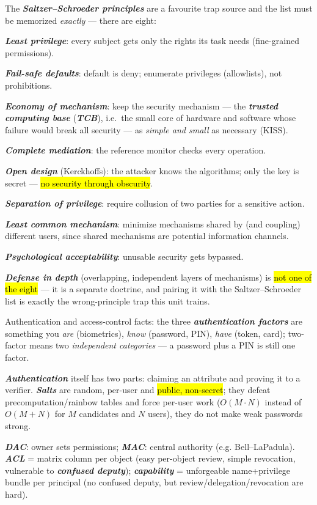 \documentclass[12pt, a4paper]{article}
\newcommand{\term}[1]{\textbf{\textit{#1}}}        %
\newcommand{\imp}[1]{\hl{#1}}                       %
\begin{document}
The \term{Saltzer--Schroeder principles} are a favourite trap source and the list must be memorized \emph{exactly} --- there are eight:
\begin{tightitem}
\item \term{Least privilege}: every subject gets only the rights its task needs (fine-grained permissions).
\item \term{Fail-safe defaults}: default is deny; enumerate privileges (allowlists), not prohibitions.
\item \term{Economy of mechanism}: keep the security mechanism --- the \term{trusted computing base} (\term{TCB}), i.e.\ the small core of hardware and software whose failure would break all security --- as \emph{simple and small} as necessary (KISS).
\item \term{Complete mediation}: the reference monitor checks every operation.
\item \term{Open design} (Kerckhoffs): the attacker knows the algorithms; only the key is secret --- \imp{no security through obscurity}.
\item \term{Separation of privilege}: require collusion of two parties for a sensitive action.
\item \term{Least common mechanism}: minimize mechanisms shared by (and coupling) different users, since shared mechanisms are potential information channels.
\item \term{Psychological acceptability}: unusable security gets bypassed.
\end{tightitem}

\term{Defense in depth} (overlapping, independent layers of mechanisms) is \imp{not one of the eight} --- it is a separate doctrine, and pairing it with the Saltzer--Schroeder list is exactly the wrong-principle trap this unit trains.

Authentication and access-control facts: the three \term{authentication factors} are something you \emph{are} (biometrics), \emph{know} (password, PIN), \emph{have} (token, card); two-factor means two \emph{independent categories} --- a password plus a PIN is still one factor.

\term{Authentication} itself has two parts: claiming an attribute and proving it to a verifier. \term{Salts} are random, per-user and \imp{public, non-secret}; they defeat precomputation/rainbow tables and force per-user work ($O(M\cdot N)$ instead of $O(M+N)$ for $M$ candidates and $N$ users), they do not make weak passwords strong.

\term{DAC}: owner sets permissions; \term{MAC}: central authority (e.g. Bell--LaPadula). \term{ACL} = matrix column per object (easy per-object review, simple revocation, vulnerable to \term{confused deputy}); \term{capability} = unforgeable name+privilege bundle per principal (no confused deputy, but review/delegation/revocation are hard).
\end{document}
